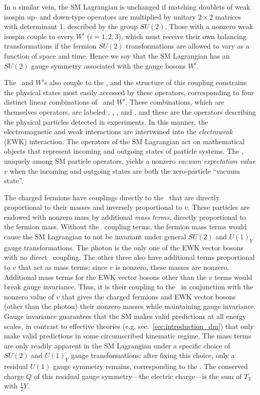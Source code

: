 In a similar vein, the SM Lagrangian is unchanged if matching doublets
of weak isospin up- and down-type operators are multiplied by unitary $2\times2$ matrices with determinant 1, described by the
group $SU(2)$. Those with a nonzero weak isospin couple to every $W^{i}$ ($i=1,2,3$), which must receive their own balancing transformations
if the fermion $SU(2)$ transformations are allowed to vary as a function of space and time.
Hence we say that the SM Lagrangian has an $SU(2)$ gauge symmetry associated with the gauge bosons $W^{i}$.

The \PB\ and $W^{i}$s also couple to the \PH, and the structure of this coupling constrains the physical states
most easily accessed by these operators, corresponding to four distinct linear combinations of
\PB\ and $W^{i}$. These combinations, which are themselves operators, are labeled \PZ, \Pgamma, \PWplus, and \PWminus,
and these are the operators describing the physical particles detected in experiments.
In this manner, the electromagnetic and weak interactions are intertwined into the \textit{electroweak} (EWK) interaction.
The operators of the SM Lagrangian act on mathematical objects that represent incoming and outgoing states of particle systems.
The \PH, uniquely among SM particle operators, yields a nonzero \textit{vacuum expectation value} $v$ when the incoming and outgoing states are both the zero-particle ``vacuum state''.

The charged fermions have couplings directly to the \PH\ that are directly proportional to their masses and inversely proportional to $v$. These particles are endowed
with nonzero mass by additional \textit{mass terms}, directly proportional to the fermion mass.
Without the \PH\ coupling terms, the fermion mass terms would cause the SM Lagrangian to not be invariant under general $SU(2)$ and $U(1)_{Y}$ gauge transformations.
The photon is the only one of the EWK vector bosons with no direct \PH\ coupling. The other three also have additional terms proportional to $v$
that act as mass terms; since $v$ is nonzero, these masses are nonzero. Additional mass terms for the EWK vector bosons other than the $v$ terms would break gauge invariance.
Thus, it is their coupling to the \PH\ in conjunction with the nonzero value of $v$ that gives the charged fermions and EWK vector bosons (other than the photon) their nonzero masses
while maintaining gauge invariance. Gauge invariance guarantees that the SM makes valid predictions at all energy scales, in contrast to effective theories
(e.g. sec.~\ref{sec:introduction_dm}) that only make valid predictions in some circumscribed kinematic regime. The mass terms are only readily apparent in the SM Lagrangian
under a specific choice of $SU(2)$ and $U(1)_{Y}$ gauge transformations: after fixing this choice, only a residual $U(1)$ gauge symmetry remains, corresponding to the
\Pgamma. The conserved charge $Q$ of this residual gauge symmetry---the electric charge---is the sum of $T_{3}$ with $\frac{1}{2}Y$.

